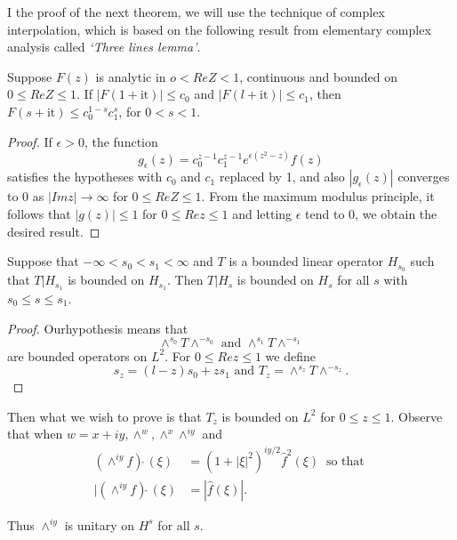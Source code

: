 I the proof of the next theorem, we will use the technique of complex
interpolation, which is based on the following result from elementary
complex analysis called \textit{ `Three lines lemma'}. 
	
\setcounter{lem}{19}
\begin{lem} \label{chap3:sec1:lem3.19}%
  Suppose $F(z)$ is analytic in $o < Re Z < 1$, continuous and
  bounded on $0 \leq Re Z \leq 1$. If $|F(1+\text{it})| \leq c_0$ and
  $|F(l+\text{it})|\leq c_1$, then $F(s+\text{it})\leq c^{1-s}_0
  c^s_1$, for $0 < s < 1$. 
\end{lem}

\begin{proof}
  If $\epsilon > 0$, the function 
  $$
  g_\epsilon (z) = c^{z-1}_0 c^{z-1}_1 e^{\epsilon (z^2 -z)}f(z)
  $$
  satisfies the hypotheses with $c_0$ and $c_1$ replaced by 1, and
  also $|g_\epsilon (z)|$ converges to $0$ as $| Im z| \to \infty $
  for $0 \leq Re Z \leq 1$. From the maximum modulus principle, it
  follows that $|g (z) |\leq 1$ for $0 \leq Re z \leq 1$ and letting
  $\epsilon $ tend to 0, we obtain the desired result.  
\end{proof}

\setcounter{thm}{20}
\begin{thm} \label{chap3:sec1:thm3.21}%
 Suppose that $-\infty < s_0 < s_1 < \infty$ and $T$ is a bounded
  linear operator $H_{s_0}$ such that $T| H_{s_1}$ is bounded on
  $H_{s_1}$. Then $T|H_s$ is bounded on $H_s$ for all $s$ with $s_0 \leq s \leq
  s_1$. 
\end{thm}

\begin{proof}
Our\pageoriginale hypothesis means that 
$$
\wedge^{s_0} T \wedge^{- s_0} \text { and } \wedge^{s_1} T \wedge^{-s_1}
$$
are bounded operators on $L^2$. For $0 \leq Re z \leq 1$ we define
 $$
s_z = (l-z) s_0 + zs_1 \text { and } T_z = \wedge^{s_z} T \wedge^{-s_z}.
$$ 
\end{proof}


Then what we wish to prove is that $T_z$ is bounded on $L^2$ for $0
\leq z \leq 1$. Observe that when $w= x + iy, \wedge^w, \wedge^x
\wedge^{iy}$ and   
\begin{align*}
   (\wedge ^{iy}f)\hat{~}(\xi) &= (1+ |\xi|^2)^{iy/2} \hat{f}^2(\xi)
  ~\text{ so that }\\ 
   | (\wedge^{iy}f)\hat{~}(\xi) & = |\hat{f}(\xi)|. 
\end{align*}

Thus $\wedge^{iy}$ is unitary on $H^s$ for all $s$. 

